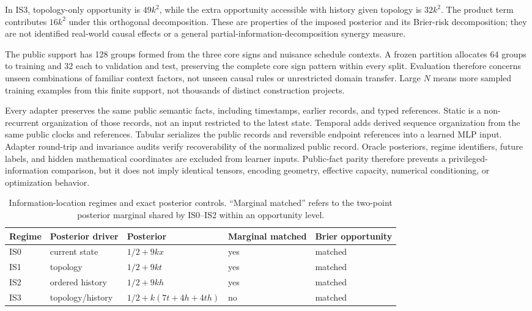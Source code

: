 \documentclass[11pt]{article}
\begin{document}
In IS3, topology-only opportunity is $49k^2$, while the extra opportunity accessible with history given topology is $32k^2$. The product term contributes $16k^2$ under this orthogonal decomposition. These are properties of the imposed posterior and its Brier-risk decomposition; they are not identified real-world causal effects or a general partial-information-decomposition synergy measure.

The public support has 128 groups formed from the three core signs and nuisance schedule contexts. A frozen partition allocates 64 groups to training and 32 each to validation and test, preserving the complete core sign pattern within every split. Evaluation therefore concerns unseen combinations of familiar context factors, not unseen causal rules or unrestricted domain transfer. Large $N$ means more sampled training examples from this finite support, not thousands of distinct construction projects.

Every adapter preserves the same public semantic facts, including timestamps, earlier records, and typed references. Static is a non-recurrent organization of those records, not an input restricted to the latest state. Temporal adds derived sequence organization from the same public clocks and references. Tabular serializes the public records and reversible endpoint references into a learned MLP input. Adapter round-trip and invariance audits verify recoverability of the normalized public record. Oracle posteriors, regime identifiers, future labels, and hidden mathematical coordinates are excluded from learner inputs. Public-fact parity therefore prevents a privileged-information comparison, but it does not imply identical tensors, encoding geometry, effective capacity, numerical conditioning, or optimization behavior.

\begin{table}[t]
\centering
\caption{Information-location regimes and exact posterior controls. ``Marginal matched'' refers to the two-point posterior marginal shared by IS0--IS2 within an opportunity level.}
\label{tab:regimes}
\small
\begin{tabular}{lllll}
\toprule
Regime & Posterior driver & Posterior & Marginal matched & Brier opportunity \\
\midrule
IS0 & current state & $1/2+9kx$ & yes & matched \\
IS1 & topology & $1/2+9kt$ & yes & matched \\
IS2 & ordered history & $1/2+9kh$ & yes & matched \\
IS3 & topology/history & $1/2+k(7t+4h+4th)$ & no & matched \\
\bottomrule
\end{tabular}
\end{table}
\end{document}
